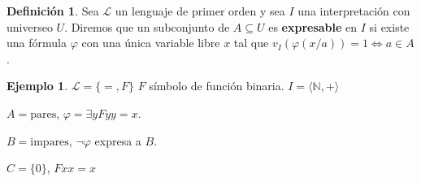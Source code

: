 \documentclass[a4paper,11pt]{article}
\theoremstyle{definition}
\newtheorem{defn}{Definición}[section]
\newtheorem{exap}{Ejemplo}[section]
\theoremstyle{remark}
\def\NN{\mathbb{N}}
\def\LL{\ensuremath{\mathcal{L}}}
\begin{document}
\begin{defn}
    Sea $\LL$ un lenguaje de primer orden y sea $I$ una interpretación
    con universeo $U$. Diremos que un subconjunto de $A \subseteq U$
    es \textbf{expresable} en $I$ si existe una fórmula $\varphi$ con
    una única variable libre $x$ tal que $v_I(\varphi(x/a)) = 1 \iff a \in A$.
\end{defn}

\begin{exap}
    $\LL = \{ =, F \}$ $F$ símbolo de función binaria.
    $I = \langle \NN, + \rangle$
    
    $A = \text{pares}$, $\varphi = \exists y F y y = x$.
    
    $B = \text{impares}$, $\lnot \varphi$ expresa a $B$.
    
    $C = \{ 0 \}$, $F x x = x$
\end{exap}
\end{document}
